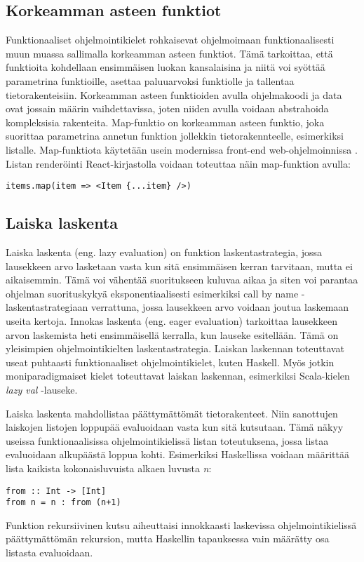 \subsection{Korkeamman asteen funktiot}
Funktionaaliset ohjelmointikielet rohkaisevat ohjelmoimaan funktionaalisesti muun muassa sallimalla korkeamman asteen
funktiot. Tämä tarkoittaa, että funktioita kohdellaan ensimmäisen luokan kansalaisina ja niitä voi syöttää parametrina
funktioille, asettaa paluuarvoksi funktiolle ja tallentaa tietorakenteisiin. Korkeamman asteen funktioiden avulla
ohjelmakoodi ja data ovat jossain määrin vaihdettavissa, joten niiden avulla voidaan abstrahoida kompleksisia
rakenteita.\cite{hudak} Map-funktio on korkeamman asteen funktio, joka suorittaa parametrina annetun funktion jollekkin
tietorakennteelle, esimerkiksi listalle. Map-funktiota käytetään usein modernissa front-end web-ohjelmoinnissa
\cite{functionalreact}. Listan renderöinti React-kirjastolla voidaan toteuttaa näin map-funktion avulla:
\begin{verbatim}
items.map(item => <Item {...item} />)
\end{verbatim}

\subsection{Laiska laskenta}
Laiska laskenta (eng. lazy evaluation) on funktion laskentastrategia, jossa lausekkeen arvo lasketaan vasta kun sitä
ensimmäisen kerran tarvitaan, mutta ei aikaisemmin. Tämä voi vähentää suoritukseen kuluvaa aikaa ja siten voi parantaa
ohjelman suorituskykyä eksponentiaalisesti esimerkiksi call by name -laskentastrategiaan verrattuna, jossa lausekkeen
arvo voidaan joutua laskemaan useita kertoja. Innokas laskenta (eng. eager evaluation) tarkoittaa lausekkeen arvon
laskemista heti ensimmäisellä kerralla, kun lauseke esitellään. Tämä on yleisimpien ohjelmointikielten
laskentastrategia. Laiskan laskennan toteuttavat useat puhtaasti funktionaaliset ohjelmointikielet, kuten Haskell. Myös
jotkin moniparadigmaiset kielet toteuttavat laiskan laskennan, esimerkiksi Scala-kielen \textit{lazy val}
-lauseke.\cite{languagedesign}

Laiska laskenta mahdollistaa päättymättömät tietorakenteet. Niin sanottujen laiskojen listojen loppupää evaluoidaan
vasta kun sitä kutsutaan. Tämä näkyy useissa funktionaalisissa ohjelmointikielissä listan toteutuksena, jossa listaa
evaluoidaan alkupäästä loppua kohti. Esimerkiksi Haskellissa voidaan määrittää lista kaikista kokonaisluvuista alkaen
luvusta \textit{n}:
\begin{verbatim}
from :: Int -> [Int]
from n = n : from (n+1)
\end{verbatim}
Funktion rekursiivinen kutsu aiheuttaisi innokkaasti laskevissa ohjelmointikielissä päättymättömän rekursion, mutta
Haskellin tapauksessa vain määrätty osa listasta evaluoidaan.\cite{languagedesign}

